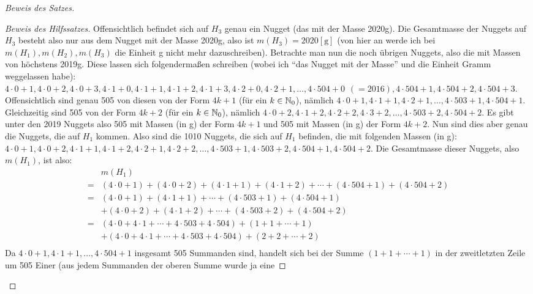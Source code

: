 \begin{proof}[Beweis des Satzes]
\begin{proof}[Beweis des Hilfssatzes]
        Offensichtlich befindet sich auf $H_3$ genau ein Nugget (das mit der Masse 2020g). Die Gesamtmasse der 
        Nuggets auf $H_3$ besteht also nur aus dem Nugget mit der Masse 2020g, also ist $m(H_3) = 2020 [\text{g}]$ 
        (von hier an werde ich bei $m(H_1), m(H_2), m(H_3)$ die Einheit g nicht mehr dazuschreiben). Betrachte man 
        nun die noch übrigen Nuggets, also die mit Massen von höchstens 2019g. Diese lassen sich folgendermaßen 
        schreiben (wobei ich "`das Nugget mit der Masse"' und die Einheit Gramm weggelassen habe): 
        $4\cdot 0+1, 4\cdot 0+2, 4\cdot 0+3, 4\cdot 1+0, 4\cdot 1+1, 4\cdot 1+2, 4\cdot 1+3, 4\cdot 2+0, 4\cdot 2+1, 
        \ldots, 4\cdot 504+0\hspace{5pt} (=2016), 4\cdot 504+1, 4\cdot 504+2, 4\cdot 504+3$. Offensichtlich sind 
        genau 505 von diesen von der Form $4k +1$ (für ein $k \in \mathbb{N}_0$), nämlich $4\cdot 0+1, 4\cdot 1+1, 4\cdot 2+1, 
        \ldots, 4\cdot 503+1, 4\cdot 504+1$. Gleichzeitig sind 505 von der Form $4k+2$ (für ein $k\in\mathbb{N}_0$), nämlich 
        $4\cdot 0+2, 4\cdot 1+2, 4\cdot 2+2, 4\cdot 3+2, \ldots, 4\cdot 503+2, 4\cdot 504+2$. Es gibt unter den 2019 
        Nuggets also 505 mit Massen (in g) der Form $4k+1$ und 505 mit Massen (in g) der Form $4k+2$. Nun sind dies 
        aber genau die Nuggets, die auf $H_1$ kommen.
        Also sind die 1010 Nuggets, die sich auf $H_1$ befinden, die mit folgenden Massen (in g): $4\cdot 0+1, 
        4\cdot 0+2, 4\cdot 1+1, 4\cdot 1+2, 4\cdot 2+1, 4\cdot 2+2, \ldots, 4\cdot 503+1, 4\cdot 503+2, 4\cdot 504+1, 
        4\cdot 504+2$. Die Gesamtmasse dieser Nuggets, also $m(H_1)$, ist also:
        \begin{align*}
            &m(H_1)\\
            =&(4\cdot 0+1)+(4\cdot 0+2)+(4\cdot 1+1)+(4\cdot 1+2)+\cdots+(4\cdot 504+1)+(4\cdot 504+2)\\
            = &(4\cdot 0+1)+(4\cdot1+1)+\cdots+(4\cdot 503+1)+(4\cdot 504+1)\\
            &+(4\cdot 0+2)+(4\cdot1+2)+\cdots+(4\cdot 503+2)+(4\cdot 504+2)\\
            = &(4\cdot0+4\cdot1+\cdots+4\cdot503+4\cdot504)+(1+1+\cdots+1)\\
            &+(4\cdot0+4\cdot1+\cdots+4\cdot503+4\cdot504)+(2+2+\cdots+2)\\
        \end{align*}
        Da $4\cdot0+1, 4\cdot1+1, \ldots, 4\cdot504+1$ insgesamt 505 Summanden sind, handelt sich bei der Summe
        $(1+1+\cdots+1)$ in der zweitletzten Zeile um 505 Einer (aus jedem Summanden der oberen Summe wurde ja eine 

\end{proof}
\end{proof}
